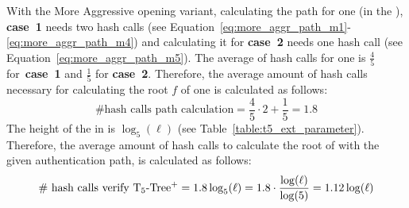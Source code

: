 With the More Aggressive opening variant, calculating the path for one \tfblock (in the \extree), \textbf{case~1} needs two hash calls (see Equation~\ref{eq:more_aggr_path_m1}-\ref{eq:more_aggr_path_m4}) and calculating it for \textbf{case~2} needs one hash call (see Equation~\ref{eq:more_aggr_path_m5}). The average of hash calls for one \tfblock is $\frac{4}{5}$ for\ \textbf{case~1} and $\frac{1}{5}$ for \textbf{case~2}. Therefore, the average amount of hash calls necessary for calculating the root $f$ of one \tfblock is calculated as follows:
\begin{equation}
\text{\# hash calls path calculation} = \frac{4}{5} \cdot 2 + \frac{1}{5} = 1.8
\end{equation}
The height of the \extree in \tfblocks is $\log_5(\ell)$ (see Table~\ref{table:t5_ext_parameter}). Therefore, the average amount of hash calls to calculate the root of \extree with the given authentication path, is calculated as follows:
\begin{equation}
\label{eq:ext_t5_hashcalls_verify}
\text{\# hash calls verify T$_5$-Tree$^+$} = 1.8\log_5(\ell) = 1.8 \cdot \frac{\log(\ell)}{\log(5)} = 1.12 \log(\ell)
\end{equation}
